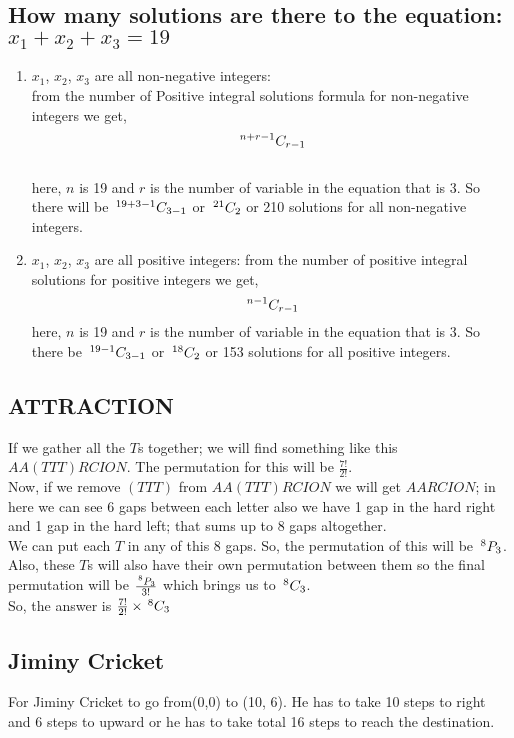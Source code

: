 \documentclass{article}
\begin{document}
\subsection{How many solutions are there to the equation: $x_1 +x_2+x_3 = 19$}
\begin{enumerate}
    \item $x_1$, $x_2$, $x_3$ are all non-negative integers:\\
        from the number of Positive integral solutions formula for non-negative integers we get,
        $$\,^{n+r-1} C _{r-1}$$\\
    here, $n$ is 19 and $r$ is the number of variable in the equation that is 3.
        So there will be $\,^{19+3-1} C _{3-1}$ or $\,^{21} C _{2}$ or 210 solutions for all non-negative integers.
    \item $x_1$, $x_2$, $x_3$ are all positive integers:
        from the number of positive integral solutions for positive integers we get,
        $$\,^{n-1} C _{r-1}$$
        here, $n$ is 19 and $r$ is the number of variable in the equation that is 3. So there be $\,^{19-1} C _{3-1}$ or $\,^{18} C _{2}$ or 153 solutions for all positive integers.
\end{enumerate}

\subsection{ATTRACTION}
If we gather all the $T$s together; we will find something like this $AA(TTT)RCION$. The permutation for this will be $\frac{7!}{2!}$.\\
Now, if we remove $(TTT)$ from $AA(TTT)RCION$ we will get $AARCION$; in here we can see 6 gaps between each letter also we have 1 gap in the hard right and 1 gap in the hard left; that sums up to 8 gaps altogether. \\
We can put each $T$ in any of this 8 gaps. So, the permutation of this will be $\,^{8} P _{3}$. Also, these $T$s will also have their own permutation between them so the final permutation will be $\frac{\,^{8} P _{3}}{3!}$ which brings us to $\,^{8} C _{3}$.\\
So, the answer is $\frac{7!}{2!}\times \,^{8} C _{3}$

\subsection{Jiminy Cricket}

For Jiminy Cricket to go from(0,0) to (10, 6). He has to take 10 steps to right and 6 steps to upward or he has to take total 16 steps to reach the destination.  
\end{document}
